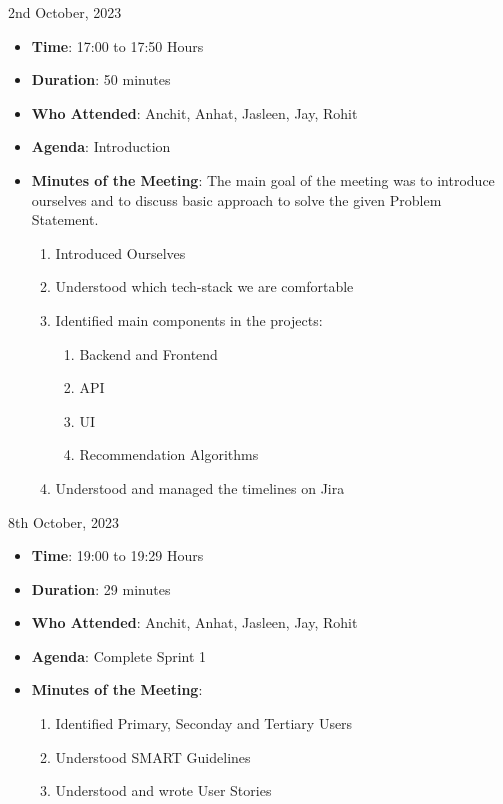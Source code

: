 \begin{myhbox}{2nd October, 2023}
    \begin{itemize}
        \item \textbf{Time}: 17:00 to 17:50 Hours
        \item \textbf{Duration}: 50 minutes
        \item \textbf{Who Attended}: Anchit, Anhat, Jasleen, Jay, Rohit
        \item \textbf{Agenda}: Introduction
        \vspace{0.5cm}
        \item \textbf{Minutes of the Meeting}: The main goal of the meeting was to introduce ourselves and to discuss basic approach to solve the given Problem Statement.
            \begin{enumerate}
                \item Introduced Ourselves
                \item Understood which tech-stack we are comfortable
                \item Identified main components in the projects:
                    \begin{enumerate}
                        \item Backend and Frontend
                        \item API
                        \item UI
                        \item Recommendation Algorithms
                    \end{enumerate}
                \item Understood and managed the timelines on Jira
            \end{enumerate}
    \end{itemize}
\end{myhbox}

\vspace{0.5cm}

\begin{myhbox}{8th October, 2023}
    \begin{itemize}
        \item \textbf{Time}: 19:00 to 19:29 Hours
        \item \textbf{Duration}: 29 minutes
        \item \textbf{Who Attended}: Anchit, Anhat, Jasleen, Jay, Rohit
        \item \textbf{Agenda}: Complete Sprint 1
        \vspace{0.5cm}
        \item \textbf{Minutes of the Meeting}:
            \begin{enumerate}
                \item Identified Primary, Seconday and Tertiary Users
                \item Understood SMART Guidelines
                \item Understood and wrote User Stories
            \end{enumerate}
    \end{itemize}
\end{myhbox}

